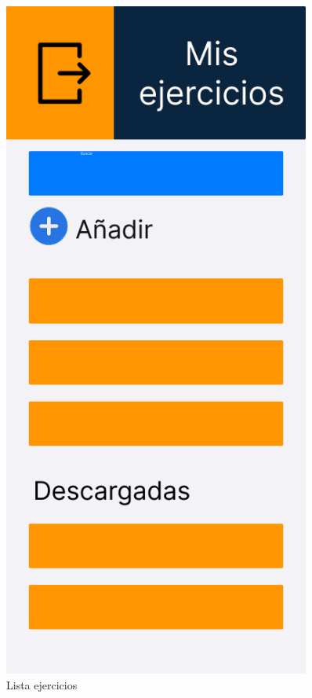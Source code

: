 \begin{figure}[H]
   \centering
   \begin{minipage}{0.45\textwidth}
      \centering
      \includegraphics[width=0.9\textwidth]{fotos/Frame 40.png}
      \caption{Lista ejercicios}

\end{minipage}
\end{figure}
